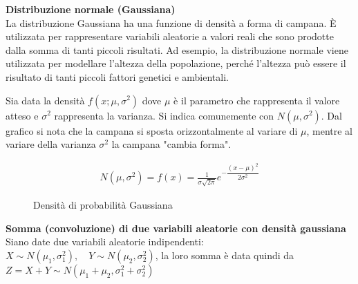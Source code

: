 \begin{defn}
    \textbf{Distribuzione normale (Gaussiana)} \\
    La distribuzione Gaussiana ha una funzione di densità a forma di campana. È
    utilizzata per rappresentare variabili aleatorie a valori reali che sono
    prodotte dalla somma di tanti piccoli risultati. Ad esempio, la
    distribuzione normale viene utilizzata per modellare l'altezza della
    popolazione, perché l'altezza può essere il risultato di tanti piccoli
    fattori genetici e ambientali.

    Sia data la densità $f(x;\mu, \sigma^2)$ dove $\mu$ è il parametro che
    rappresenta il valore atteso e $\sigma^2$ rappresenta la varianza. Si indica
    comunemente con $N(\mu, \sigma^2)$. Dal grafico si nota che la campana si sposta orizzontalmente al
    variare di $\mu$, mentre al variare della varianza $\sigma^2$ la campana
    "cambia forma".

    \begin{equation*}
        \begin{aligned}
            N(\mu, \sigma^2) = f(x) = \frac{1}{\sigma \sqrt{2\pi}} e^{-\dfrac{(x - \mu)^2}{2 \sigma^2}}
        \end{aligned}
    \end{equation*}


    \begin{figure}[htbp!]
        \centering

        \caption{Densità di probabilità Gaussiana}
        \label{gaussian}
    \end{figure}
\end{defn}

\begin{defn}
    \textbf{Somma (convoluzione) di due variabili aleatorie con densità gaussiana} \\
    Siano date due variabili aleatorie indipendenti: $X \sim N(\mu_1, \sigma_1^2),\quad Y
    \sim N(\mu_2, \sigma_2^2) $, la loro somma è data quindi da $Z = X + Y \sim
    N(\mu_1 + \mu_2, \sigma_1^2 + \sigma_2^2 )$
\end{defn}


